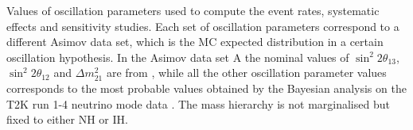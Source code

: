 \begin{table}[H]
\centering

\caption{
Values of oscillation parameters used to compute the event rates, systematic effects and sensitivity studies. Each set of oscillation parameters correspond to a different Asimov data set, which is the MC expected distribution in a certain oscillation hypothesis.
In the Asimov data set A the nominal values of $\sin^2 2 \theta_{13}$, $\sin^2 2 \theta_{12}$ and $\Delta m^2_{21}$  are from \cite{pdg_2014}, while all the other oscillation parameter values corresponds to the most probable values obtained by the Bayesian analysis on the T2K run 1-4 neutrino mode data \cite{T2KLongPaper}. The mass hierarchy is not marginalised but fixed to either NH or IH.
}
\label{tab:asimov_definition1}
\end{table}